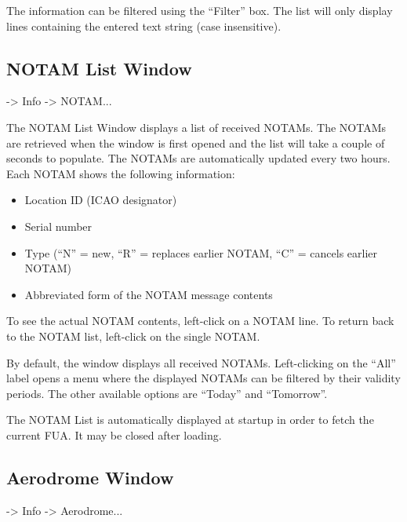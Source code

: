 \documentclass[a4paper,oneside,11pt]{memoir}
\begin{document}
\bigskip

The information can be filtered using the “Filter” box. The list will only display lines containing the entered text string (case insensitive).

\subsection{NOTAM List Window}
\label{win:notamlw}

 -> Info -> NOTAM...

\bigskip


The NOTAM List Window displays a list of received NOTAMs. The NOTAMs are retrieved when the window is first opened and the list will take a couple of seconds to populate. The NOTAMs are automatically updated every two hours. Each NOTAM shows the following information:

\begin{itemize}
    \item Location ID (ICAO designator)
    \item Serial number
    \item Type (“N” = new, “R” = replaces earlier NOTAM, “C” = cancels earlier NOTAM)
    \item Abbreviated form of the NOTAM message contents
\end{itemize}

\bigskip

To see the actual NOTAM contents, left-click on a NOTAM line. To return back to the NOTAM list, left-click on the single NOTAM.

\bigskip

By default, the window displays all received NOTAMs. Left-clicking on the “All” label opens a menu where the displayed NOTAMs can be filtered by their validity periods. The other available options are “Today” and “Tomorrow”.

\bigskip

The NOTAM List is automatically displayed at startup in order to fetch the current FUA. It may be closed after loading.

\subsection{Aerodrome Window}
\label{win:adw}

 -> Info -> Aerodrome...
\end{document}
